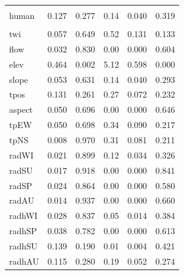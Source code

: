 \begin{table}
\begin{tabular}{lrrrrr}
\addlinespace[0.3em]
\multicolumn{6}{l}{\textbf{Landscape}}\\
\hspace{1em}human & 0.127 & 0.277 & 0.14 & 0.040 & 0.319\\
\addlinespace[0.3em]
\multicolumn{6}{l}{\textbf{Topography}}\\
\hspace{1em}twi & 0.057 & 0.649 & 0.52 & 0.131 & 0.133\\
\hspace{1em}flow & 0.032 & 0.830 & 0.00 & 0.000 & 0.604\\
\hspace{1em}elev & 0.464 & 0.002 & 5.12 & 0.598 & 0.000\\
\hspace{1em}slope & 0.053 & 0.631 & 0.14 & 0.040 & 0.293\\
\hspace{1em}tpos & 0.131 & 0.261 & 0.27 & 0.072 & 0.232\\
\hspace{1em}aspect & 0.050 & 0.696 & 0.00 & 0.000 & 0.646\\
\hspace{1em}tpEW & 0.050 & 0.698 & 0.34 & 0.090 & 0.217\\
\hspace{1em}tpNS & 0.008 & 0.970 & 0.31 & 0.081 & 0.211\\
\hspace{1em}radWI & 0.021 & 0.899 & 0.12 & 0.034 & 0.326\\
\hspace{1em}radSU & 0.017 & 0.918 & 0.00 & 0.000 & 0.841\\
\hspace{1em}radSP & 0.024 & 0.864 & 0.00 & 0.000 & 0.580\\
\hspace{1em}radAU & 0.014 & 0.937 & 0.00 & 0.000 & 0.660\\
\hspace{1em}radhWI & 0.028 & 0.837 & 0.05 & 0.014 & 0.384\\
\hspace{1em}radhSP & 0.038 & 0.782 & 0.00 & 0.000 & 0.613\\
\hspace{1em}radhSU & 0.139 & 0.190 & 0.01 & 0.004 & 0.421\\
\hspace{1em}radhAU & 0.115 & 0.280 & 0.19 & 0.052 & 0.274\\
\bottomrule
\end{tabular}
\endgroup{}
\end{table}



